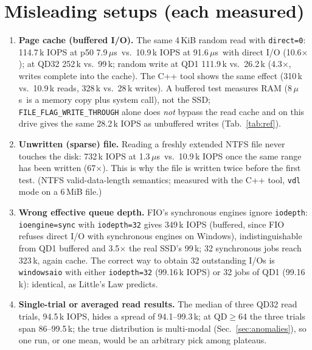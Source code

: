 ﻿\documentclass[10.5pt]{article}
\newcommand{\us}{\,$\mu$s}
\begin{document}
\section{Misleading setups (each measured)}\label{sec:pitfalls}
\begin{enumerate}
  \item \textbf{Page cache (buffered I/O).} The same 4\,KiB random read with \texttt{direct=0}: 114.7\,k IOPS at p50 7.9\us\ vs.\ 10.9\,k IOPS at 91.6\us\ with direct I/O (10.6$\times$); at QD32 252\,k vs.\ 99\,k; random write at QD1 111.9\,k vs.\ 26.2\,k (4.3$\times$, writes complete into the cache). The C++ tool shows the same effect (310\,k vs.\ 10.9\,k reads, 328\,k vs.\ 28\,k writes). A buffered test measures RAM (8\us\ is a memory copy plus system call), not the SSD; \texttt{FILE\_FLAG\_WRITE\_THROUGH} alone does \emph{not} bypass the read cache and on this drive gives the same 28.2\,k IOPS as unbuffered writes (Tab.~\ref{tab:ref}).
  \item \textbf{Unwritten (sparse) file.} Reading a freshly extended NTFS file never touches the disk: 732\,k IOPS at 1.3\us\ vs.\ 10.9\,k IOPS once the same range has been written (67$\times$). This is why the file is written twice before the first test. (NTFS valid-data-length semantics; measured with the C++ tool, \texttt{vdl} mode on a 6\,MiB file.)
  \item \textbf{Wrong effective queue depth.} FIO's synchronous engines ignore \texttt{iodepth}: \texttt{ioengine=sync} with \texttt{iodepth=32} gives 349\,k IOPS (buffered, since FIO refuses direct I/O with synchronous engines on Windows), indistinguishable from QD1 buffered and 3.5$\times$ the real SSD's 99\,k; 32 synchronous jobs reach 323\,k, again cache. The correct way to obtain 32 outstanding I/Os is \texttt{windowsaio} with either \texttt{iodepth=32} (99.16\,k IOPS) or 32 jobs of QD1 (99.16\,k): identical, as Little's Law predicts.
  \item \textbf{Single-trial or averaged read results.} The median of three QD32 read trials, 94.5\,k IOPS, hides a spread of 94.1--99.3\,k; at QD$\ge$64 the three trials span 86--99.5\,k; the true distribution is multi-modal (Sec.~\ref{sec:anomalies}), so one run, or one mean, would be an arbitrary pick among plateaus.
\end{enumerate}
\begin{table}[H]\centering\small
\caption{Independent C++ tool (3 runs $\times$ 8--10\,s per mode, medians): buffered and unwritten-file cases are the misleading ones.}\label{tab:ref}\end{table}
\end{document}
